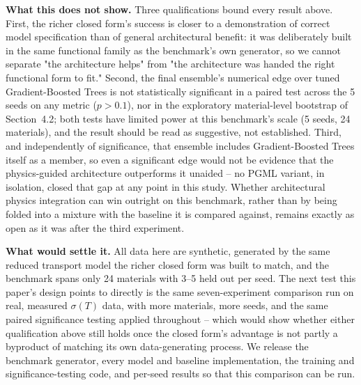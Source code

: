 \documentclass[11pt]{article}
\begin{document}
\textbf{What this does not show.} Three qualifications bound every result above. First, the richer closed form's success is closer to a demonstration of correct model specification than of general architectural benefit: it was deliberately built in the same functional family as the benchmark's own generator, so we cannot separate "the architecture helps" from "the architecture was handed the right functional form to fit." Second, the final ensemble's numerical edge over tuned Gradient-Boosted Trees is not statistically significant in a paired test across the 5 seeds on any metric ($p > 0.1$), nor in the exploratory material-level bootstrap of Section~4.2; both tests have limited power at this benchmark's scale (5 seeds, 24 materials), and the result should be read as suggestive, not established. Third, and independently of significance, that ensemble includes Gradient-Boosted Trees itself as a member, so even a significant edge would not be evidence that the physics-guided architecture outperforms it unaided -- no PGML variant, in isolation, closed that gap at any point in this study. Whether architectural physics integration can win outright on this benchmark, rather than by being folded into a mixture with the baseline it is compared against, remains exactly as open as it was after the third experiment.

\textbf{What would settle it.} All data here are synthetic, generated by the same reduced transport model the richer closed form was built to match, and the benchmark spans only 24 materials with 3--5 held out per seed. The next test this paper's design points to directly is the same seven-experiment comparison run on real, measured $\sigma(T)$ data, with more materials, more seeds, and the same paired significance testing applied throughout -- which would show whether either qualification above still holds once the closed form's advantage is not partly a byproduct of matching its own data-generating process. We release the benchmark generator, every model and baseline implementation, the training and significance-testing code, and per-seed results so that this comparison can be run.
\end{document}
